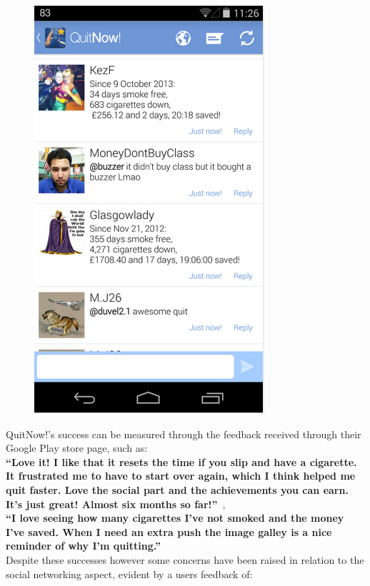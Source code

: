 \documentclass[a4paper,12pt]{article}
\begin{document}
\begin{figure}[!ht]
\begin{minipage}{.5\textwidth}
  \includegraphics[width=.6\linewidth]{./images/application-quitnow-social}
  \label{application-quitnow-social}
\end{minipage}
\end{figure}

QuitNow!'s success can be measured through the feedback received through their Google Play store page, such as: \\

\indent\textbf{``Love it! I like that it resets the time if you slip and have a cigarette. It frustrated me to have to start over again, which I think helped me quit faster. Love the social part and the achievements you can earn. It's just great! Almost six months so far!''}~\citep{quitnow},\\

\indent\textbf{``I love seeing how many cigarettes I've not smoked and the money I've saved. When I need an extra push the image galley is a nice reminder of why I'm quitting.''}~\citep{quitnow}\\

Despite these successes however some concerns have been raised in relation to the social networking aspect, evident by a users feedback of:\ 
\end{document}
